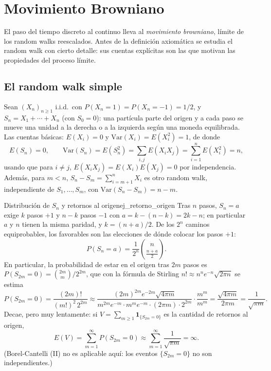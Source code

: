 \documentclass[11pt, a4paper]{article}
\begin{document}
\newpage

\section{Movimiento Browniano}

El paso del tiempo discreto al continuo lleva al \emph{movimiento browniano}, límite de los
random walks reescalados. Antes de la definición axiomática se estudia el random walk con
cierto detalle: sus cuentas explícitas son las que motivan las propiedades del proceso
límite.

\subsection{El random walk simple}

Sean $(X_n)_{n \ge 1}$ i.i.d.\ con $P(X_n = 1) = P(X_n = -1) = 1/2$, y $S_n = X_1 + \cdots +
X_n$ (con $S_0 = 0$): una partícula parte del origen y a cada paso se mueve una unidad a la
derecha o a la izquierda según una moneda equilibrada. Las cuentas básicas: $E(X_i) = 0$ y
$\mathrm{Var}(X_i) = E(X_i^2) = 1$, de donde
$$ E(S_n) = 0, \qquad \mathrm{Var}(S_n) = E(S_n^2) = \sum_{i,j} E(X_i X_j) = \sum_{i=1}^n
E(X_i^2) = n, $$
usando que para $i \ne j$, $E(X_i X_j) = E(X_i) E(X_j) = 0$ por independencia. Además, para
$m < n$, $S_n - S_m = \sum_{i = m+1}^n X_i$ es otro random walk, independiente de
$S_1, \dots, S_m$, con $\mathrm{Var}(S_n - S_m) = n - m$.

\begin{ejemplo}{Distribución de $S_n$ y retornos al origen}{ej_retorno_origen}
Tras $n$ pasos, $S_n = a$ exige $k$ pasos $+1$ y $n - k$ pasos $-1$ con $a = k - (n - k) =
2k - n$; en particular $a$ y $n$ tienen la misma paridad, y $k = (n + a)/2$. De los $2^n$
caminos equiprobables, los favorables son las elecciones de dónde colocar los pasos $+1$:
$$ P(S_n = a) = \frac{1}{2^n} \binom{n}{\frac{n+a}{2}}. $$
En particular, la probabilidad de estar en el origen tras $2m$ pasos es $P(S_{2m} = 0) =
\binom{2m}{m} / 2^{2m}$, que con la fórmula de Stirling $n! \approx n^n e^{-n} \sqrt{2 \pi n}$
se estima
$$ P(S_{2m} = 0) = \frac{(2m)!}{(m!)^2 \, 2^{2m}} \approx
\frac{(2m)^{2m} e^{-2m} \sqrt{4 \pi m}}{m^{2m} e^{-m} \cdot m^{m} e^{-m} \cdot (2 \pi m) \cdot
2^{2m}} \cdot \frac{m^{m}}{m^{m}} = \frac{\sqrt{4 \pi m}}{2 \pi m} = \frac{1}{\sqrt{\pi m}}. $$
Decae, pero muy lentamente: si $V = \sum_{m \ge 1} \mathbf{1}_{\{S_{2m} = 0\}}$ es la cantidad
de retornos al origen,
$$ E(V) = \sum_{m=1}^\infty P(S_{2m} = 0) \approx \sum_{m=1}^\infty \frac{1}{\sqrt{\pi m}} =
\infty. $$
(Borel-Cantelli (II) no es aplicable aquí: los eventos $\{S_{2m} = 0\}$ no son
independientes.)
\end{ejemplo}
\end{document}
